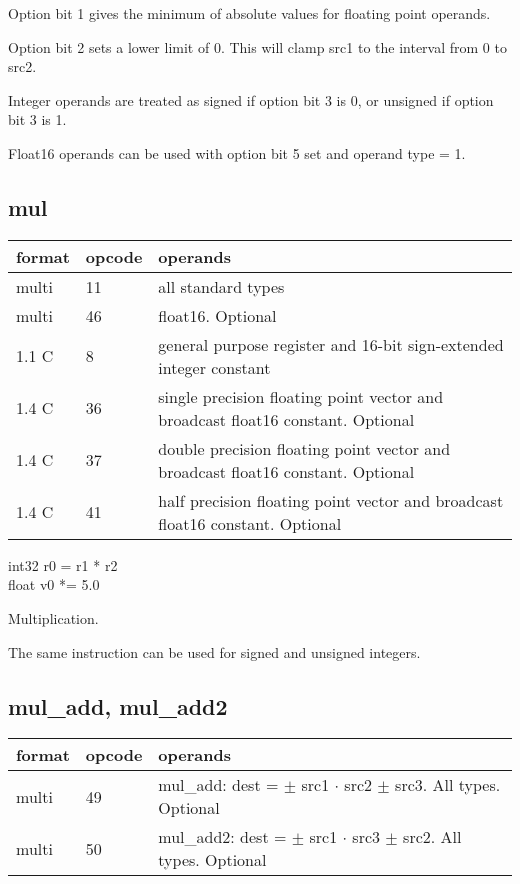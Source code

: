 \documentclass[forwardcom.tex]{subfiles}
\begin{document}
Option bit 1 gives the minimum of absolute values for floating point operands.
\vv

Option bit 2 sets a lower limit of 0. This will clamp src1 to the interval from 0 to src2.
\vv

Integer operands are treated as signed if option bit 3 is 0, or unsigned if option bit 3 is 1.
\vv

Float16 operands can be used with option bit 5 set and operand type = 1.
\vv


\subsection{mul}
\label{table:mulInstruction}
\begin{tabular}{|p{12mm}|p{15mm}|p{100mm}|}
\hline
\bfseries format & \bfseries opcode & \bfseries operands \\ \hline
multi & 11 & all standard types \\ \hline
multi & 46 & float16. Optional \\ \hline
1.1 C &  8 & general purpose register and 16-bit sign-extended integer constant \\ \hline
1.4 C & 36 & single precision floating point vector and broadcast float16 constant. Optional \\ \hline
1.4 C & 37 & double precision floating point vector and broadcast float16 constant. Optional \\ \hline
1.4 C & 41 & half precision floating point vector and broadcast float16 constant. Optional \\ \hline
\end{tabular}
\vv

int32 r0 = r1 * r2 \\
float v0 *= 5.0
\vv

Multiplication.
\vv

The same instruction can be used for signed and unsigned integers.
\vv


\subsection{mul\_add, mul\_add2}
\label{table:mulAddInstruction}
\begin{tabular}{|p{12mm}|p{15mm}|p{100mm}|}
\hline
\bfseries format & \bfseries opcode & \bfseries operands \\ \hline
multi & 49 & mul\_add: dest = $\pm$ src1 $\cdot$ src2 $\pm$ src3. All types. Optional \\ 
multi & 50 & mul\_add2: dest = $\pm$ src1 $\cdot$ src3 $\pm$ src2. All types. Optional \\ \hline
\end{tabular}
\vv
\end{document}
